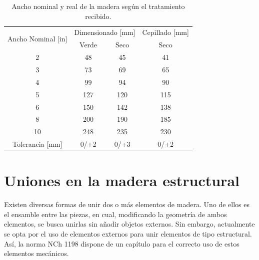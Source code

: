 \begin{table}[H]
\centering
\begin{tabular}{@{}cccc@{}}
\toprule
\multirow{2}{*}{Ancho Nominal {[}in{]}} & \multicolumn{2}{c}{Dimensionado {[}mm{]}} & Cepillado {[}mm{]} \\ \cmidrule(l){2-4} 
                                        & Verde                & Seco               & Seco               \\ \midrule
2                                       & 48                   & 45                 & 41                 \\
3                                       & 73                   & 69                 & 65                 \\
4                                       & 99                   & 94                 & 90                 \\
5                                       & 127                  & 120                & 115                \\
6                                       & 150                  & 142                & 138                \\
8                                       & 200                  & 190                & 185                \\
10                                      & 248                  & 235                & 230                \\ \midrule
Tolerancia {[}mm{]}                     & 0/+2                 & 0/+3               & 0/+2               \\ \bottomrule
\end{tabular}
\caption{Ancho nominal y real de la madera según el tratamiento recibido.}
\label{tab:anchodim}
\end{table}

\section{Uniones en la madera estructural}
Existen diversas formas de unir dos o más elementos de madera. Uno de ellos es el ensamble entre las piezas, en cual, modificando la geometría de ambos elementos, se busca unirlas sin añadir objetos externos. Sin embargo, actualmente se opta por el uso de elementos externos para unir elementos de tipo estructural. Así, la norma NCh 1198 dispone de un capítulo para el correcto uso de estos elementos mecánicos.
